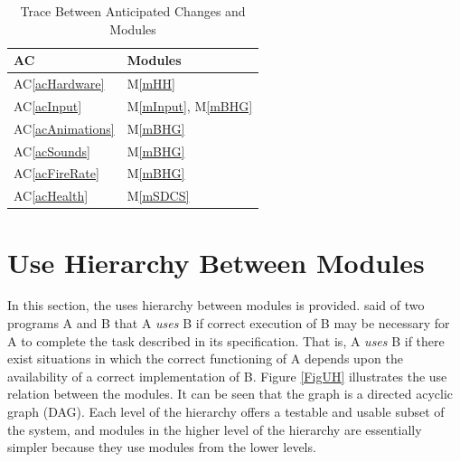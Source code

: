 \documentclass[12pt, titlepage]{article}
\newcommand{\acref}[1]{AC\ref{#1}}
\newcommand{\mref}[1]{M\ref{#1}}
\begin{document}
\begin{table}[H]
\centering
\begin{tabular}{p{} p{}}
\toprule
\textbf{AC} & \textbf{Modules}\\
\midrule
\acref{acHardware} & \mref{mHH}\\
\acref{acInput} & \mref{mInput}, \mref{mBHG}\\
\acref{acAnimations} & \mref{mBHG}\\
\acref{acSounds} & \mref{mBHG}\\
\acref{acFireRate} & \mref{mBHG}\\
\acref{acHealth} & \mref{mSDCS}\\
\bottomrule
\end{tabular}
\caption{Trace Between Anticipated Changes and Modules}
\label{TblACT}
\end{table}

\section{Use Hierarchy Between Modules} \label{SecUse}

In this section, the uses hierarchy between modules is
provided. \citet{Parnas1978} said of two programs A and B that A {\em uses} B if
correct execution of B may be necessary for A to complete the task described in
its specification. That is, A {\em uses} B if there exist situations in which
the correct functioning of A depends upon the availability of a correct
implementation of B.  Figure \ref{FigUH} illustrates the use relation between
the modules. It can be seen that the graph is a directed acyclic graph
(DAG). Each level of the hierarchy offers a testable and usable subset of the
system, and modules in the higher level of the hierarchy are essentially simpler
because they use modules from the lower levels.
\end{document}
